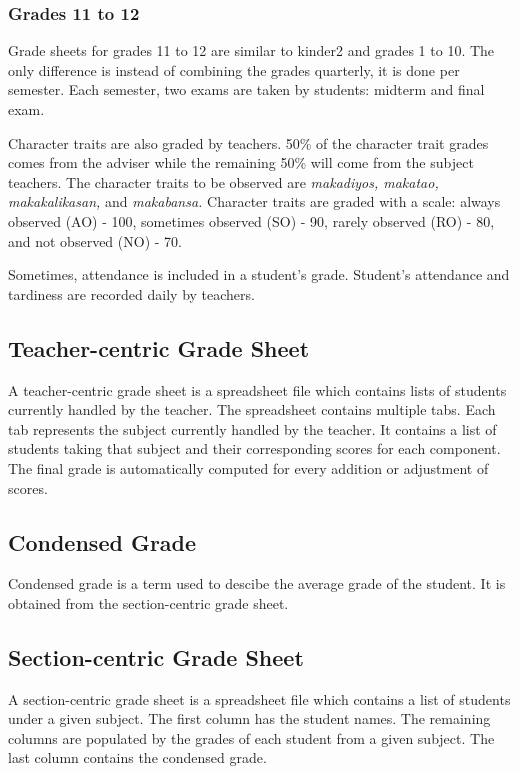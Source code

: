 \documentclass[11pt,a4paper,titlepage]{article}
\begin{document}
\subsubsection{Grades 11 to 12}
Grade sheets for grades 11 to 12 are similar to kinder2 and grades 1 to 10. The only difference is instead of combining the grades quarterly, it is done per semester. Each semester, two exams are taken by students: midterm and final exam.

Character traits are also graded by teachers. 50\% of the character trait grades comes from the adviser while the remaining 50\% will come from the subject teachers. The character traits to be observed are \textit{makadiyos, makatao, makakalikasan,} and \textit{makabansa.} Character traits are graded with a scale: always observed (AO) - 100, sometimes observed (SO) - 90, rarely observed (RO) - 80, and not observed (NO) - 70.

Sometimes, attendance is included in a student's grade. Student's attendance and tardiness are recorded daily by teachers.

\subsection{Teacher-centric Grade Sheet}
A teacher-centric grade sheet is a spreadsheet file which contains lists of students currently handled by the teacher. The spreadsheet contains multiple tabs. Each tab represents the subject currently handled by the teacher. It contains a list of students taking that subject and their corresponding scores for each component. The final grade is automatically computed for every addition or adjustment of scores.

\subsection{Condensed Grade}
Condensed grade is a term used to descibe the average grade of the student. It is obtained from the section-centric grade sheet. 

\subsection{Section-centric Grade Sheet}
A section-centric grade sheet is a spreadsheet file which contains a list of students under a given subject. The first column has the student names. The remaining columns are populated by the grades of each student from a given subject. The last column contains the condensed grade.
\end{document}
